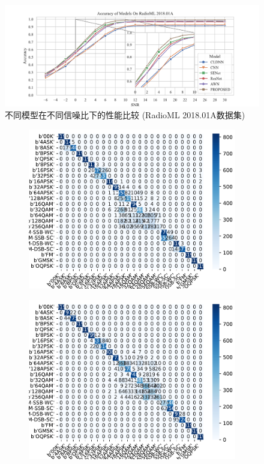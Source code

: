   \begin{figure}
    \centering
    \includegraphics[width=\textwidth]{Image/model_res.pdf}
    \caption{不同模型在不同信噪比下的性能比较 (RadioML 2018.01A数据集)}
    \label{fig:model_acc}
\end{figure}


\begin{figure}[ht]
    \centering
    \begin{subfigure}[b]{0.45\textwidth}
      \includegraphics[width=\textwidth]{Image/cldnn_18a.pdf}
      \label{fig:image1}
    \end{subfigure}
    \hfill
    \begin{subfigure}[b]{0.45\textwidth}
      \includegraphics[width=\textwidth]{Image/cnn_18a.pdf}

\end{subfigure}
\end{figure}
